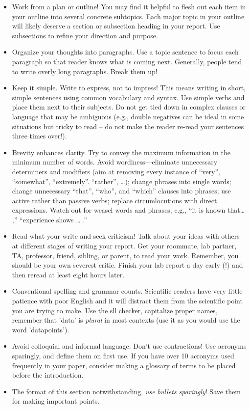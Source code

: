 \documentclass[12pt,preprint]{aastex}
\begin{document}
\begin{itemize}
\item Work from a plan or outline! You may find it helpful to flesh out each item in your outline into several concrete subtopics. Each major topic in your outline will likely deserve a section or subsection heading in your report. Use subsections to refine your direction and purpose.
\item Organize your thoughts into paragraphs. Use a topic sentence to focus each paragraph so that reader knows what is coming next.  Generally, people tend to write overly long paragraphs. Break them up!
\item Keep it simple. Write to express, not to impress! This means writing in short, simple sentences using common vocabulary and syntax. Use simple verbs and place them next to their subjects. Do not get tied down in complex clauses or language that may be ambiguous (e.g., double negatives can be ideal in some situations but tricky to read – do not make the reader re-read your sentences three times over!).
\item Brevity enhances clarity. Try to convey the maximum information in the minimum number of words. Avoid wordiness—eliminate unnecessary determiners and modifiers (aim at removing every instance of “very”, “somewhat”, “extremely”. “rather”, …); change phrases into single words; change unnecessary “that”, “who”, and “which” clauses into phrases; use active rather than passive verbs; replace circumlocutions with direct expressions. Watch out for weasel words and phrases, e.g., “it is known that… ,” “experience shows … .”
\item Read what your write and seek criticism! Talk about your ideas with others at different stages of writing your report. Get your roommate, lab partner, TA, professor, friend, sibling, or parent, to read your work. Remember, you should be your own severest critic. Finish your lab report a day early (!) and then reread at least eight hours later.
\item Conventional spelling and grammar counts. Scientific readers have very little patience with poor English and it will distract them from the scientific point you are trying to make. Use the sll checker, capitalize proper names, remember that 'data' is \emph{plural} in most contexts (use it as you would use the word 'datapoints').
\item Avoid colloquial and informal language. Don’t use contractions! Use acronyms sparingly, and define them on first use. If you have over 10 acronyms used frequently in your paper, consider making a glossary of terms to be placed before the introduction.
\item The format of this section notwithstanding, {\it use bullets sparingly}! Save them for making important points.
\end{itemize}
\end{document}
